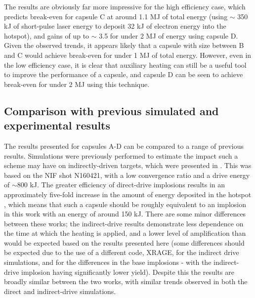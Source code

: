 The results are obviously far more impressive for the high efficiency case, which predicts break-even for capsule C at around 1.1 MJ of total energy (using $\sim$ 350 kJ of short-pulse laser energy to deposit 32 kJ of electron energy into the hotspot), and gains of up to $\sim$ 3.5 for under 2 MJ of energy using capsule D. Given the observed trends, it appears likely that a capsule with size between B and C would achieve break-even for under 1 MJ of total energy. However, even in the low efficiency case, it is clear that auxiliary heating can still be a useful tool to improve the performance of a capsule, and capsule D can be seen to achieve break-even for under 2 MJ using this technique.

\subsection{Comparison with previous simulated and experimental results}

The results presented for capsules A-D can be compared to a range of previous results. Simulations were previously performed to estimate the impact such a scheme may have on indirectly-driven targets, which were presented in \cite{Norreys2021}. This was based on the NIF shot N160421, with a low convergence ratio and a drive energy of $\sim 800$ kJ. The greater efficiency of direct-drive implosions results in an approximately five-fold increase in the amount of energy deposited in the hotspot \cite{Campbell2017, Goncharov2016}, which means that such a capsule should be roughly equivalent to an implosion in this work with an energy of around 150 kJ. There are some minor differences between these works; the indirect-drive results demonstrate less dependence on the time at which the heating is applied, and a lower level of amplification than would be expected based on the results presented here (some differences should be expected due to the use of a different code, XRAGE, for the indirect drive simulations, and for the differences in the base implosions - with the indirect-drive implosion having significantly lower yield). Despite this the results are broadly similar between the two works, with similar trends observed in both the direct and indirect-drive simulations.

